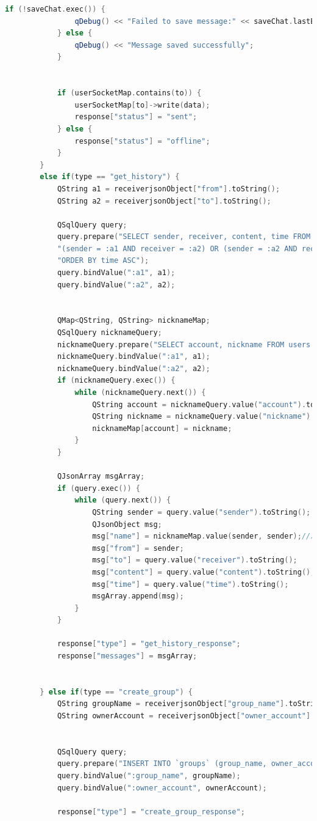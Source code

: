 \documentclass[UTF8]{ctexart}
\begin{document}
\begin{lstlisting}[language=C++, caption=服务端接受信息并处理]
			if (!saveChat.exec()) {
				qDebug() << "Failed to save message:" << saveChat.lastError().text();
			} else {
				qDebug() << "Message saved successfully";
			}
			
			
			if (userSocketMap.contains(to)) {
				userSocketMap[to]->write(data);
				response["status"] = "sent";
			} else {
				response["status"] = "offline";
			}
		}
		else if(type == "get_history") {
			QString a1 = receiverjsonObject["from"].toString();
			QString a2 = receiverjsonObject["to"].toString();
			
			QSqlQuery query;
			query.prepare("SELECT sender, receiver, content, time FROM messages WHERE "
			"(sender = :a1 AND receiver = :a2) OR (sender = :a2 AND receiver = :a1) "
			"ORDER BY time ASC");
			query.bindValue(":a1", a1);
			query.bindValue(":a2", a2);
			
			
			QMap<QString, QString> nicknameMap;
			QSqlQuery nicknameQuery;
			nicknameQuery.prepare("SELECT account, nickname FROM users WHERE account = :a1 OR account = :a2");
			nicknameQuery.bindValue(":a1", a1);
			nicknameQuery.bindValue(":a2", a2);
			if (nicknameQuery.exec()) {
				while (nicknameQuery.next()) {
					QString account = nicknameQuery.value("account").toString();
					QString nickname = nicknameQuery.value("nickname").toString();
					nicknameMap[account] = nickname;
				}
			}
			
			QJsonArray msgArray;
			if (query.exec()) {
				while (query.next()) {
					QString sender = query.value("sender").toString();
					QJsonObject msg;
					msg["name"] = nicknameMap.value(sender, sender);//发送者的名称
					msg["from"] = sender;
					msg["to"] = query.value("receiver").toString();
					msg["content"] = query.value("content").toString();
					msg["time"] = query.value("time").toString();
					msgArray.append(msg);
				}
			}
			
			response["type"] = "get_history_response";
			response["messages"] = msgArray;
			
			
		} else if(type == "create_group") {
			QString groupName = receiverjsonObject["group_name"].toString();
			QString ownerAccount = receiverjsonObject["owner_account"].toString();
			
			
			QSqlQuery query;
			query.prepare("INSERT INTO `groups` (group_name, owner_account) VALUES (:group_name, :owner_account)");
			query.bindValue(":group_name", groupName);
			query.bindValue(":owner_account", ownerAccount);
			
			response["type"] = "create_group_response";
			

\end{lstlisting}
\end{document}
